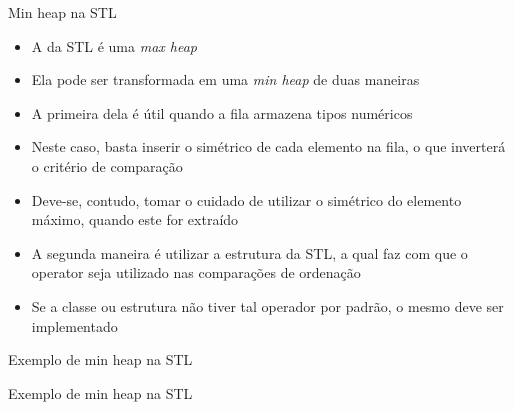 \begin{frame}[fragile]{Min heap na STL}

    \begin{itemize}
        \item A  da STL é uma \textit{max heap}

        \item Ela pode ser transformada em uma \textit{min heap} de duas maneiras

        \item A primeira dela é útil quando a fila armazena tipos numéricos

        \item Neste caso, basta inserir o simétrico de cada elemento na fila, o que inverterá
            o critério de comparação

        \item Deve-se, contudo, tomar o cuidado de utilizar o simétrico do elemento máximo,
            quando este for extraído

        \item A segunda maneira é utilizar a estrutura  da STL, a qual 
            faz com que o operator  seja utilizado nas comparações de ordenação

        \item Se a classe ou estrutura não tiver tal operador por padrão, o mesmo deve ser
            implementado
    \end{itemize}

\end{frame}

\begin{frame}[fragile]{Exemplo de min heap na STL}
\end{frame}

\begin{frame}[fragile]{Exemplo de min heap na STL}
\end{frame}
